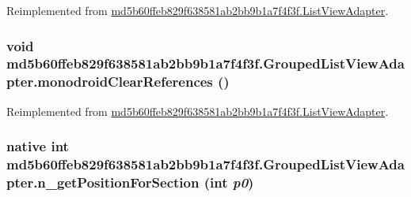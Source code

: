 Reimplemented from \hyperlink{classmd5b60ffeb829f638581ab2bb9b1a7f4f3f_1_1_list_view_adapter_1325a463fbf8e693412780668a9e9a7e}{md5b60ffeb829f638581ab2bb9b1a7f4f3f.ListViewAdapter}.\hypertarget{classmd5b60ffeb829f638581ab2bb9b1a7f4f3f_1_1_grouped_list_view_adapter_4634afbff45178960582fdfba5d55008}{
\subsubsection[{monodroidClearReferences}]{\setlength{\rightskip}{0pt plus 5cm}void md5b60ffeb829f638581ab2bb9b1a7f4f3f.GroupedListViewAdapter.monodroidClearReferences ()}}
\label{classmd5b60ffeb829f638581ab2bb9b1a7f4f3f_1_1_grouped_list_view_adapter_4634afbff45178960582fdfba5d55008}




Reimplemented from \hyperlink{classmd5b60ffeb829f638581ab2bb9b1a7f4f3f_1_1_list_view_adapter_92941f5776f2c562a319f8c0cce9f2a4}{md5b60ffeb829f638581ab2bb9b1a7f4f3f.ListViewAdapter}.\hypertarget{classmd5b60ffeb829f638581ab2bb9b1a7f4f3f_1_1_grouped_list_view_adapter_900f0e8b77bd057257fff593067b5b58}{
\subsubsection[{n\_\-getPositionForSection}]{\setlength{\rightskip}{0pt plus 5cm}native int md5b60ffeb829f638581ab2bb9b1a7f4f3f.GroupedListViewAdapter.n\_\-getPositionForSection (int {\em p0})}}
\label{classmd5b60ffeb829f638581ab2bb9b1a7f4f3f_1_1_grouped_list_view_adapter_900f0e8b77bd057257fff593067b5b58}


